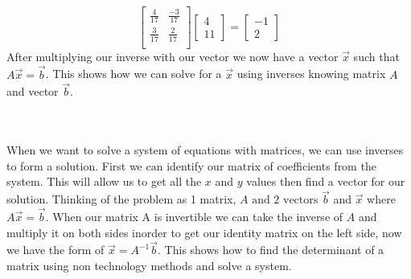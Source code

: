 \documentclass[12pt]{article}
\begin{document}
\begin{equation*}
\begin{bmatrix}
\frac{4}{17} & \frac{-3}{17} \\
\frac{3}{17} & \frac{2}{17} \\
\end{bmatrix}
\begin{bmatrix}
4 \\ 11
\end{bmatrix} = \begin{bmatrix}
-1 \\ 2
\end{bmatrix}
\end{equation*}
After multiplying our inverse with our vector we now have a vector $\vec{x}$ such that $A\vec{x} =\vec{b}$. This shows how we can solve for a $\vec{x}$ using inverses knowing matrix $A$ and vector $\vec{b}$.
\\\\ \\
\begin{flushleft}
When we want to solve a system of equations with matrices, we can use inverses to form a solution. First we can identify our matrix of coefficients from the system. This will allow us to get all the $x$ and $y$ values then find a vector for our solution. Thinking of the problem as 1 matrix, $ A \text{ and 2 vectors }\vec{b}$ and  $\vec{x}$ where $A \vec{x} = \vec{b}$. When our matrix A is invertible we can take the inverse of $A$ and multiply it on both sides inorder to get our identity matrix on the left side, now we have the form of $\vec{x} = A^{-1}\vec{b}$. This shows how to find the determinant of a matrix using non technology methods and solve a system.
\end{flushleft}
\end{document}
